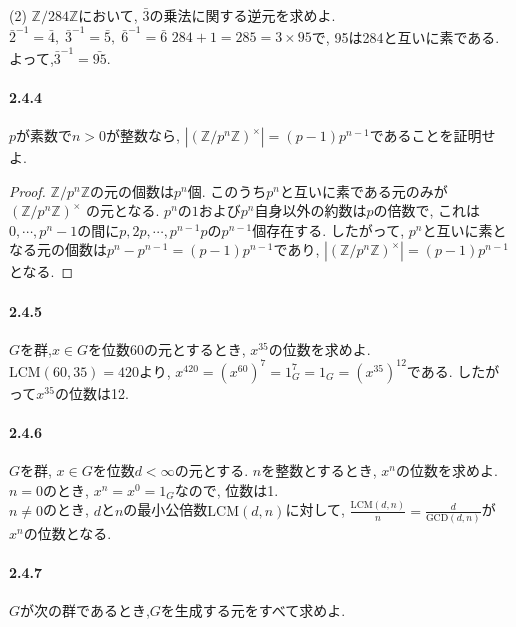 (2) $\mathbb{Z}/284\mathbb{Z}$において, $\bar{3}$の乗法に関する逆元を求めよ.\\

$\bar{2}^{-1}=\bar{4},\; \bar{3}^{-1}=\bar{5},\;\bar{6}^{-1}=\bar{6}$
$284+1=285=3\times 95$で, 95は284と互いに素である. 
よって,$\bar{3}^{-1}=\bar{95}$.\\

\paragraph{2.4.4} $p$が素数で$n>0$が整数なら,
$|(\mathbb{Z}/p^n\mathbb{Z})^\times |=(p-1)p^{n-1}$であることを証明せよ.
\begin{proof}
	$\mathbb{Z}/p^n\mathbb{Z}$の元の個数は$p^n$個.
	このうち$p^n$と互いに素である元のみが$(\mathbb{Z}/p^n\mathbb{Z})^\times$
	の元となる.
	$p^n$の$1$および$p^n$自身以外の約数は$p$の倍数で,
	これは$0,\cdots,p^n-1$の間に$p,2p,\cdots,p^{n-1}p$の$p^{n-1}$個存在する.
	したがって, $p^n$と互いに素となる元の個数は$p^n - p^{n-1}=(p-1)p^{n-1}$であり,
	$|(\mathbb{Z}/p^n\mathbb{Z})^\times |=(p-1)p^{n-1}$となる.
\end{proof}\leavevmode

\paragraph{2.4.5} $G$を群,$x \in G$を位数60の元とするとき,
$x^{35}$の位数を求めよ.\\
$\mathrm{LCM}(60,35)=420$より,
$x^{420}=(x^{60})^7=1_G^7=1_G=(x^{35})^{12}$である.
したがって$x^{35}$の位数は12.\newline

\paragraph{2.4.6} $G$を群, $x \in G$を位数$d<\infty$の元とする.
$n$を整数とするとき, $x^n$の位数を求めよ.\\

$n=0$のとき, $x^n=x^0=1_G$なので, 位数は1.\\
$n\neq0$のとき, $d$と$n$の最小公倍数$\mathrm{LCM}(d,n)$に対して,
$\frac{\mathrm{LCM}(d,n)}{n}=\frac{d}{\mathrm{GCD}(d,n)}$が
$x^n$の位数となる.\newline

\paragraph{2.4.7} $G$が次の群であるとき,$G$を生成する元をすべて求めよ.

